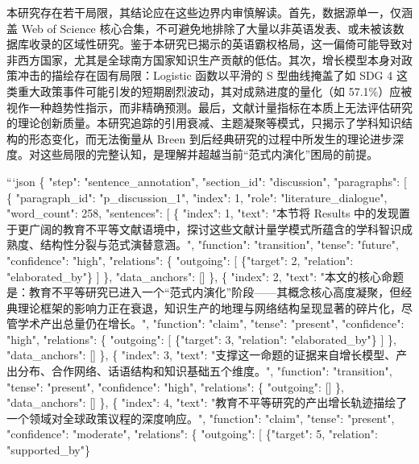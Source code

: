\documentclass[12pt,a4paper]{article}
\begin{document}
本研究存在若干局限，其结论应在这些边界内审慎解读。首先，数据源单一，仅涵盖 Web of Science 核心合集，不可避免地排除了大量以非英语发表、或未被该数据库收录的区域性研究。鉴于本研究已揭示的英语霸权格局，这一偏倚可能导致对非西方国家，尤其是全球南方国家知识生产贡献的低估。其次，增长模型本身对政策冲击的描绘存在固有局限：Logistic 函数以平滑的 S 型曲线掩盖了如 SDG 4 这类重大政策事件可能引发的短期剧烈波动，其对成熟进度的量化（如 57.1\%）应被视作一种趋势性指示，而非精确预测。最后，文献计量指标在本质上无法评估研究的理论创新质量。本研究追踪的引用衰减、主题凝聚等模式，只揭示了学科知识结构的形态变化，而无法衡量从 Breen 到后经典研究的过程中所发生的理论进步深度。对这些局限的完整认知，是理解并超越当前“范式内演化”困局的前提。

```json
\{
  "step": "sentence\_annotation",
  "section\_id": "discussion",
  "paragraphs": [
    \{
      "paragraph\_id": "p\_discussion\_1",
      "index": 1,
      "role": "literature\_dialogue",
      "word\_count": 258,
      "sentences": [
        \{
          "index": 1,
          "text": "本节将 Results 中的发现置于更广阔的教育不平等文献语境中，探讨这些文献计量学模式所蕴含的学科智识成熟度、结构性分裂与范式演替意涵。",
          "function": "transition",
          "tense": "future",
          "confidence": "high",
          "relations": \{
            "outgoing": [
              \{"target": 2, "relation": "elaborated\_by"\}
            ]
          \},
          "data\_anchors": []
        \},
        \{
          "index": 2,
          "text": "本文的核心命题是：教育不平等研究已进入一个“范式内演化”阶段——其概念核心高度凝聚，但经典理论框架的影响力正在衰退，知识生产的地理与网络结构呈现显著的碎片化，尽管学术产出总量仍在增长。",
          "function": "claim",
          "tense": "present",
          "confidence": "high",
          "relations": \{
            "outgoing": [
              \{"target": 3, "relation": "elaborated\_by"\}
            ]
          \},
          "data\_anchors": []
        \},
        \{
          "index": 3,
          "text": "支撑这一命题的证据来自增长模型、产出分布、合作网络、话语结构和知识基础五个维度。",
          "function": "transition",
          "tense": "present",
          "confidence": "high",
          "relations": \{
            "outgoing": []
          \},
          "data\_anchors": []
        \},
        \{
          "index": 4,
          "text": "教育不平等研究的产出增长轨迹描绘了一个领域对全球政策议程的深度响应。",
          "function": "claim",
          "tense": "present",
          "confidence": "moderate",
          "relations": \{
            "outgoing": [
              \{"target": 5, "relation": "supported\_by"\}
\end{document}
